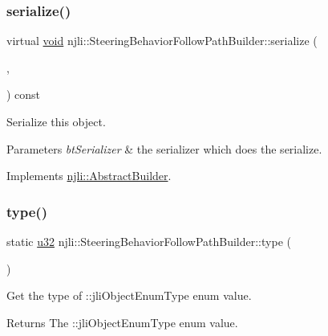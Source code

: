 \subsubsection{\texorpdfstring{serialize()}{serialize()}}
{\footnotesize\ttfamily virtual \mbox{\hyperlink{_thread_8h_af1e856da2e658414cb2456cb6f7ebc66}{void}} njli\+::\+Steering\+Behavior\+Follow\+Path\+Builder\+::serialize (\begin{DoxyParamCaption}\item[{\mbox{\hyperlink{_thread_8h_af1e856da2e658414cb2456cb6f7ebc66}{void}} $\ast$}]{,  }\item[{bt\+Serializer $\ast$}]{ }\end{DoxyParamCaption}) const\hspace{0.3cm}{\ttfamily [virtual]}}

Serialize this object.


\begin{DoxyParams}{Parameters}
{\em bt\+Serializer} & the serializer which does the serialize. \\
\hline
\end{DoxyParams}


Implements \mbox{\hyperlink{classnjli_1_1_abstract_builder_ab66b774e02ccb9da554c9aab7fa6d981}{njli\+::\+Abstract\+Builder}}.

\mbox{\label{classnjli_1_1_steering_behavior_follow_path_builder_af658f0273f4e86148d45654eae482be1}} 
\subsubsection{\texorpdfstring{type()}{type()}}
{\footnotesize\ttfamily static \mbox{\hyperlink{_util_8h_a10e94b422ef0c20dcdec20d31a1f5049}{u32}} njli\+::\+Steering\+Behavior\+Follow\+Path\+Builder\+::type (\begin{DoxyParamCaption}{ }\end{DoxyParamCaption})\hspace{0.3cm}{\ttfamily [static]}}

Get the type of \+::jli\+Object\+Enum\+Type enum value.

\begin{DoxyReturn}{Returns}
The \+::jli\+Object\+Enum\+Type enum value. 
\end{DoxyReturn}


